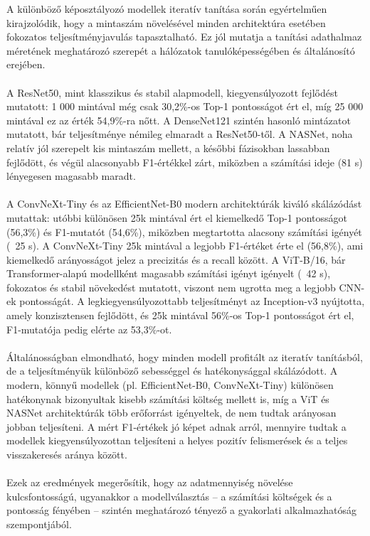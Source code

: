     A különböző képosztályozó modellek iteratív tanítása során egyértelműen kirajzolódik, hogy a mintaszám növelésével minden architektúra esetében fokozatos teljesítményjavulás tapasztalható. Ez jól mutatja a tanítási adathalmaz méretének meghatározó szerepét a hálózatok tanulóképességében és általánosító erejében.
    \\\\
    A ResNet50, mint klasszikus és stabil alapmodell, kiegyensúlyozott fejlődést mutatott: 1 000 mintával még csak 30,2\%-os Top-1 pontosságot ért el, míg 25 000 mintával ez az érték 54,9\%-ra nőtt. A DenseNet121 szintén hasonló mintázatot mutatott, bár teljesítménye némileg elmaradt a ResNet50-től. A NASNet, noha relatív jól szerepelt kis mintaszám mellett, a későbbi fázisokban lassabban fejlődött, és végül alacsonyabb F1-értékkel zárt, miközben a számítási ideje (81 s) lényegesen magasabb maradt.
    \\\\
    A ConvNeXt-Tiny és az EfficientNet-B0 modern architektúrák kiváló skálázódást mutattak: utóbbi különösen 25k mintával ért el kiemelkedő Top-1 pontosságot (56,3\%) és F1-mutatót (54,6\%), miközben megtartotta alacsony számítási igényét (~25 s). A ConvNeXt-Tiny 25k mintával a legjobb F1-értéket érte el (56,8\%), ami kiemelkedő arányosságot jelez a precizitás és a recall között. A ViT-B/16, bár Transformer-alapú modellként magasabb számítási igényt igényelt (~42 s), fokozatos és stabil növekedést mutatott, viszont nem ugrotta meg a legjobb CNN-ek pontosságát. A legkiegyensúlyozottabb teljesítményt az Inception-v3 nyújtotta, amely konzisztensen fejlődött, és 25k mintával 56\%-os Top-1 pontosságot ért el, F1-mutatója pedig elérte az 53,3\%-ot.
    \\\\
    Általánosságban elmondható, hogy minden modell profitált az iteratív tanításból, de a teljesítményük különböző sebességgel és hatékonysággal skálázódott. A modern, könnyű modellek (pl. EfficientNet-B0, ConvNeXt-Tiny) különösen hatékonynak bizonyultak kisebb számítási költség mellett is, míg a ViT és NASNet architektúrák több erőforrást igényeltek, de nem tudtak arányosan jobban teljesíteni. A mért F1-értékek jó képet adnak arról, mennyire tudtak a modellek kiegyensúlyozottan teljesíteni a helyes pozitív felismerések és a teljes visszakeresés aránya között.
    \\\\
    Ezek az eredmények megerősítik, hogy az adatmennyiség növelése kulcsfontosságú, ugyanakkor a modellválasztás – a számítási költségek és a pontosság fényében – szintén meghatározó tényező a gyakorlati alkalmazhatóság szempontjából.

